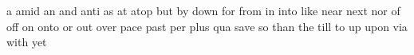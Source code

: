 \Addlcwords
  {%
    a amid an and anti as at atop but by down for from in into like near next nor of off on onto or out over pace past per plus qua save so than the till to up upon via with yet
  }
